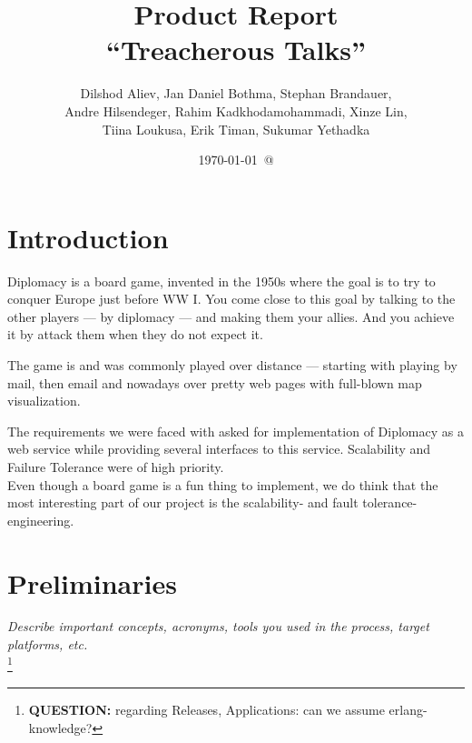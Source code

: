 \documentclass[11pt,a4paper]{report}
\newcommand{\hi}[1]{{\color{red}\em #1\/}\\}
\newcommand{\ask}[1]{\footnote{{\color{red} {\bf QUESTION:} #1}}}
\begin{document}
\title{Product Report \\
  ``Treacherous Talks''}
\date{\today\ @ \currenttime}
\author{Dilshod Aliev, Jan Daniel Bothma, Stephan Brandauer,\\
 Andre Hilsendeger, Rahim Kadkhodamohammadi, Xinze Lin,\\
Tiina Loukusa, Erik Timan, Sukumar Yethadka}
\maketitle
\tableofcontents


\chapter{Introduction}
Diplomacy is a board game, invented in the 1950s where the goal is to try to
conquer Europe just before WW I. You come close to this goal by talking to the
other players --- by diplomacy --- and making them your allies. And you achieve
it by attack them when they do not expect it.

The game is and was commonly played over distance --- starting with playing by
mail, then email and nowadays over pretty web pages with full-blown map
visualization.

The requirements we were faced with asked for implementation of Diplomacy as a
web service while providing several interfaces to this service. Scalability and
Failure Tolerance were of high priority. \\
Even though a board game is a fun thing to implement, we do think that the most
interesting part of our project is the scalability- and fault tolerance-
engineering.

\chapter{Preliminaries}
\hi{Describe important concepts, acronyms, tools you used in the process, target platforms, etc.}
\ask{regarding Releases, Applications: can we assume erlang-knowledge?}
\end{document}
